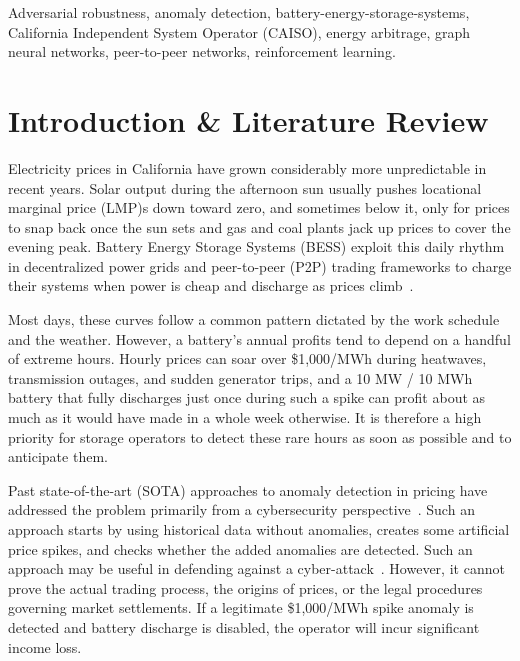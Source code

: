 \documentclass[journal]{IEEEtran}
\begin{document}
\begin{IEEEkeywords}
Adversarial robustness, anomaly detection, battery-energy-storage-systems, California Independent System Operator (CAISO), energy arbitrage, graph neural networks, peer-to-peer networks, reinforcement learning.
\end{IEEEkeywords}

\section{Introduction \& Literature Review}
\label{sec:intro}

Electricity prices in California have grown considerably more unpredictable in recent years. Solar output during the afternoon sun usually pushes locational marginal price (LMP)s down toward zero, and sometimes below it, only for prices to snap back once the sun sets and gas and coal plants jack up prices to cover the evening peak. Battery Energy Storage Systems (BESS) exploit this daily rhythm in decentralized power grids and peer-to-peer (P2P) trading frameworks to charge their systems when power is cheap and discharge as prices climb~\cite{Chen_DRL_BESS, P2P_Systems_Book}.

Most days, these curves follow a common pattern dictated by the work schedule and the weather. However, a battery's annual profits tend to depend on a handful of extreme hours. Hourly prices can soar over \$1,000/MWh during heatwaves, transmission outages, and sudden generator trips, and a 10 MW / 10 MWh battery that fully discharges just once during such a spike can profit about as much as it would have made in a whole week otherwise. It is therefore a high priority for storage operators to detect these rare hours as soon as possible and to anticipate them. 

Past state-of-the-art (SOTA) approaches to anomaly detection in pricing have addressed the problem primarily from a cybersecurity perspective~\cite{Vulnerability_Analysis, AE_Anomaly, Xie_FDI}. Such an approach starts by using historical data without anomalies, creates some artificial price spikes, and checks whether the added anomalies are detected. Such an approach may be useful in defending against a cyber-attack~\cite{Kurt_FDI_Detection}. However, it cannot prove the actual trading process, the origins of prices, or the legal procedures governing market settlements. If a legitimate \$1,000/MWh spike anomaly is detected and battery discharge is disabled, the operator will incur significant income loss.
\end{document}
